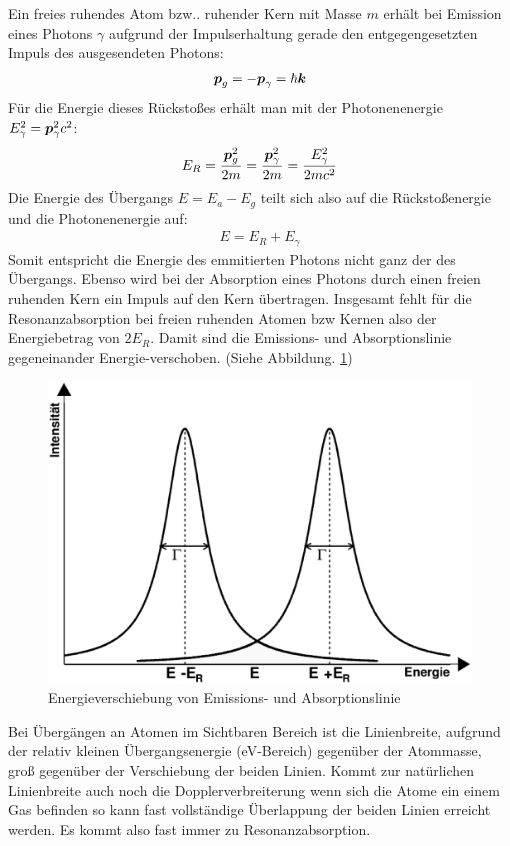 \documentclass[12pt]{article}
\renewcommand*\vec[1]{{\mbox{\boldmath\ensuremath{#1}}}}
\begin{document}
Ein freies ruhendes Atom bzw.. ruhender Kern mit Masse $m$ erhält bei Emission eines Photons $\gamma$ aufgrund der Impulserhaltung
gerade den entgegengesetzten Impuls des ausgesendeten Photons:
\begin{align}
 \vec{p}_g = -\vec{p}_\gamma = \hbar\vec{k}
\end{align}
Für die Energie dieses Rückstoßes erhält man mit der Photonenenergie $E^2_\gamma = \vec{p}^2_\gamma c^2$:
\begin{align}
 E_R = \frac{\vec{p}_g^2}{2m} = \frac{\vec{p}^2_\gamma}{2m} = \frac{E^2_\gamma}{2mc^2}
 \label{e_r}
\end{align}
Die Energie des Übergangs $E = E_a - E_g$ teilt sich also auf die Rückstoßenergie und die Photonenenergie auf:
\begin{align}
 E = E_R + E_\gamma
\end{align}
Somit entspricht die Energie des emmitierten Photons nicht ganz der des Übergangs. Ebenso wird bei der Absorption eines Photons durch einen freien ruhenden
Kern ein Impuls auf den Kern übertragen. Insgesamt fehlt für die Resonanzabsorption bei freien ruhenden Atomen bzw Kernen also der Energiebetrag von $2E_R$.
Damit sind die Emissions- und Absorptionslinie gegeneinander Energie-verschoben. (Siehe Abbildung. \ref{energieverschiebung})
\begin{figure}
 \includegraphics[width=0.9\linewidth]{pictures/energieverschiebung.eps}
 \caption{Energieverschiebung von Emissions- und Absorptionslinie}
 \label{energieverschiebung}
\end{figure}
Bei Übergängen an Atomen im Sichtbaren Bereich ist die Linienbreite, aufgrund der relativ kleinen Übergangsenergie (eV-Bereich) gegenüber der Atommasse,
groß gegenüber der Verschiebung der beiden Linien. Kommt zur natürlichen Linienbreite auch noch die Dopplerverbreiterung wenn sich die Atome ein einem Gas
befinden so kann fast vollständige Überlappung der beiden Linien erreicht werden. Es kommt also fast immer zu Resonanzabsorption.
\end{document}
